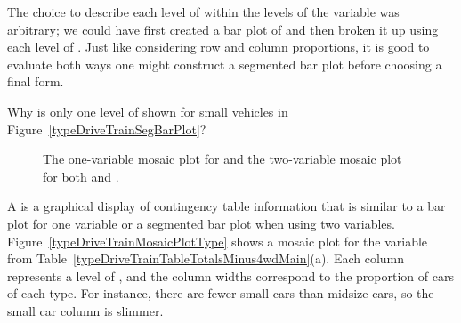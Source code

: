 The choice to describe each level of  within the levels of the  variable was arbitrary; we could have first created a bar plot of  and then broken it up using each level of . Just like considering row and column proportions, it is good to evaluate both ways one might construct a segmented bar plot before choosing a final form.


\begin{exercise}
Why is only one level of  shown for small vehicles in Figure~\ref{typeDriveTrainSegBarPlot}? %
\end{exercise}


\begin{figure}[p]
\centering
{}
\caption{The one-variable mosaic plot for  and the two-variable mosaic plot for both  and .}
\label{typeDriveTrainMosaicPlot}
\end{figure}
A  is a graphical display of contingency table information that is similar to a bar plot for one variable or a segmented bar plot when using two variables. 
Figure~\ref{typeDriveTrainMosaicPlotType} shows a mosaic plot for the  variable from Table~\ref{typeDriveTrainTableTotalsMinus4wdMain}(a). Each column represents a level of , and the column widths correspond to the proportion of cars of each type. For instance, there are fewer small cars than midsize cars, so the small car column is slimmer.

